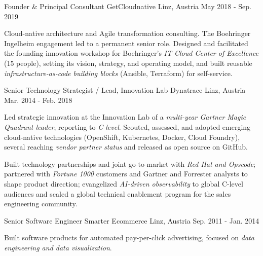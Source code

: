 \begin{cventries}
  \cventry
    {Founder \& Principal Consultant} %
    {GetCloudnative} %
    {Linz, Austria} %
    {May 2018 - Sep. 2019} %
    {
      \begin{cvprose}
      Cloud-native architecture and Agile transformation consulting. The Boehringer Ingelheim engagement led to a permanent senior role. Designed and facilitated the founding innovation workshop for Boehringer's \textit{IT Cloud Center of Excellence} (15 people), setting its vision, strategy, and operating model, and built reusable \textit{infrastructure-as-code building blocks} (Ansible, Terraform) for self-service.
      \end{cvprose}
    }

  \cventry
    {Senior Technology Strategist / Lead, Innovation Lab} %
    {Dynatrace} %
    {Linz, Austria} %
    {Mar. 2014 - Feb. 2018} %
    {
      \begin{cvitems}
        \item {Led strategic innovation at the Innovation Lab of a \textit{multi-year Gartner Magic Quadrant leader}, reporting to \textit{C-level}. Scouted, assessed, and adopted emerging cloud-native technologies (OpenShift, Kubernetes, Docker, Cloud Foundry), several reaching \textit{vendor partner status} and released as open source on GitHub.}
        \item {Built technology partnerships and joint go-to-market with \textit{Red Hat and Opscode}; partnered with \textit{Fortune 1000} customers and Gartner and Forrester analysts to shape product direction; evangelized \textit{AI-driven observability} to global C-level audiences and scaled a global technical enablement program for the sales engineering community.}
      \end{cvitems}
    }

  \cventry
    {Senior Software Engineer} %
    {Smarter Ecommerce} %
    {Linz, Austria} %
    {Sep. 2011 - Jan. 2014} %
    {
      \begin{cvprose}
      Built software products for automated pay-per-click advertising, focused on \textit{data engineering and data visualization}.
      \end{cvprose}
    }


\end{cventries}
